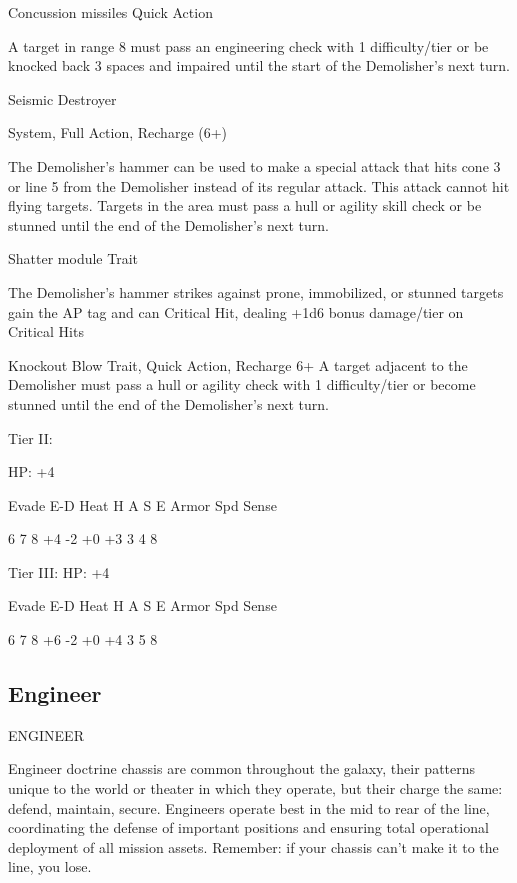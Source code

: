                                                                                                           


Concussion missiles  
Quick Action
 
A target in range 8 must pass an engineering check with 1 difficulty/tier or be knocked back 3  
spaces and impaired until the start of the Demolisher’s next turn.
 

Seismic Destroyer
 
System, Full Action, Recharge (6+)
 
The Demolisher’s hammer can be used to make a special attack that hits cone 3 or line 5 from  
the Demolisher instead of its regular attack. This attack cannot hit flying targets. Targets in the  
area must pass a hull or agility skill check or be stunned until the end of the Demolisher’s next  
turn.
 

Shatter module  
Trait
 
The Demolisher’s hammer strikes against prone, immobilized, or stunned targets gain the AP tag  
and can Critical Hit, dealing +1d6 bonus damage/tier on Critical Hits
 

Knockout Blow  
Trait, Quick Action, Recharge 6+  
A target adjacent to the Demolisher must pass a hull or agility check with 1 difficulty/tier or  
become stunned until the end of the Demolisher’s next turn.
 

Tier II:
 
HP: +4
 

          Evade     E-D    Heat    H     A     S     E       Armor        Spd       Sense 

          6         7      8       +4    -2    +0    +3      3            4         8 

Tier III:  
HP: +4
 

          Evade     E-D    Heat    H     A     S     E       Armor        Spd       Sense 

          6         7      8       +6    -2    +0    +4      3            5         8 

                                                                                                                  

\subsection{Engineer}
                                              ENGINEER  

Engineer doctrine chassis are common throughout the galaxy, their patterns unique to the world  
or theater in which they operate, but their charge the same: defend, maintain, secure. Engineers  
operate best in the mid to rear of the line, coordinating the defense of important positions and  
ensuring total operational deployment of all mission assets. Remember: if your chassis can’t  
make it to the line, you lose.
 

